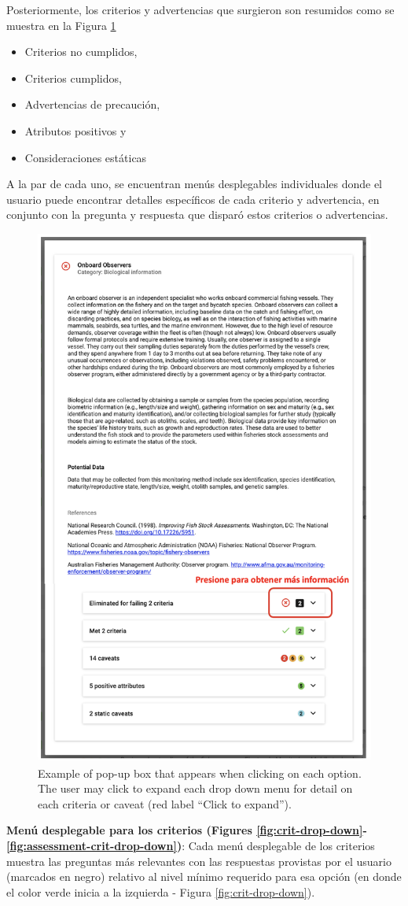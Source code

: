 \documentclass[
  11pt,
]{book}
\providecommand{\tightlist}{%
  \setlength{\itemsep}{0pt}\setlength{\parskip}{0pt}}
\begin{document}
Posteriormente, los criterios y advertencias que surgieron son resumidos como se muestra en la Figura \ref{fig:opt-desc}

\begin{itemize}
\tightlist
\item
  Criterios no cumplidos,
\item
  Criterios cumplidos,
\item
  Advertencias de precaución,
\item
  Atributos positivos y
\item
  Consideraciones estáticas
\end{itemize}

A la par de cada uno, se encuentran menús desplegables individuales donde el usuario puede encontrar detalles específicos de cada criterio y advertencia, en conjunto con la pregunta y respuesta que disparó estos criterios o advertencias.

\begin{figure}

{\centering \includegraphics[width=0.5\linewidth]{images/option-description-es} 

}

\caption{Example of pop-up box that appears when clicking on each option. The user may click to expand each drop down menu for detail on each criteria or caveat (red label “Click to expand”).}\label{fig:opt-desc}
\end{figure}

\textbf{Menú desplegable para los criterios (Figures \ref{fig:crit-drop-down}-\ref{fig:assessment-crit-drop-down})}: Cada menú desplegable de los criterios muestra las preguntas más relevantes con las respuestas provistas por el usuario (marcados en negro) relativo al nivel mínimo requerido para esa opción (en donde el color verde inicia a la izquierda - Figura \ref{fig:crit-drop-down}).
\end{document}
